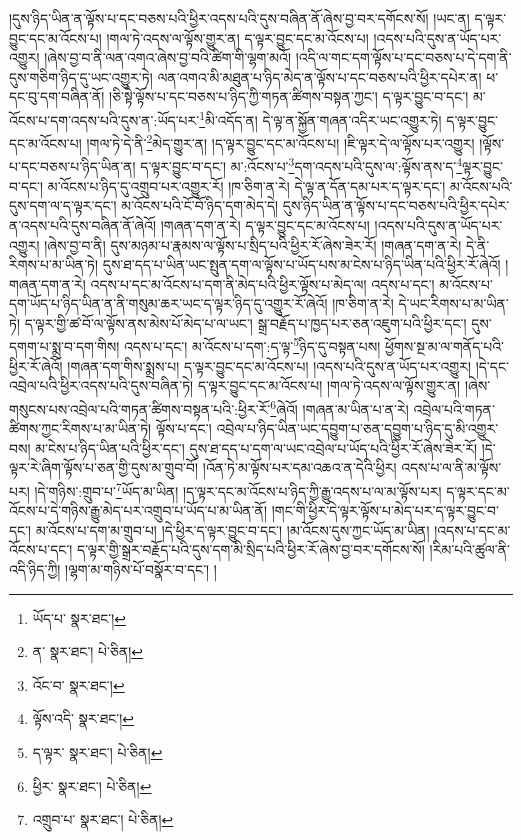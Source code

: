 །དུས་ཉིད་ཡིན་ན་ལྟོས་པ་དང་བཅས་པའི་ཕྱིར་འདས་པའི་དུས་བཞིན་ནོ་ཞེས་བྱ་བར་དགོངས་སོ། །ཡང་ན། ད་ལྟར་བྱུང་དང་མ་འོངས་པ། །གལ་ཏེ་འདས་ལ་ལྟོས་གྱུར་ན། ད་ལྟར་བྱུང་དང་མ་འོངས་པ། །འདས་པའི་དུས་ན་ཡོད་པར་འགྱུར། །ཞེས་བྱ་བ་ནི་ལན་འགའ་ཞེས་བྱ་བའི་ཚིག་གི་ལྷག་མའོ། །འདི་ལ་གང་དག་ལྟོས་པ་དང་བཅས་པ་དེ་དག་ནི་དུས་གཅིག་ཉིད་དུ་ཡང་འགྱུར་ཏེ། ལན་འགའ་མི་མཐུན་པ་ཉིད་མེད་ན་ལྟོས་པ་དང་བཅས་པའི་ཕྱིར་དཔེར་ན། ཕ་དང་བུ་དག་བཞིན་ནོ། །ཅི་སྟེ་ལྟོས་པ་དང་བཅས་པ་ཉིད་ཀྱི་གཏན་ཚིགས་བསྟན་ཀྱང་། ད་ལྟར་བྱུང་བ་དང་། མ་འོངས་པ་དག་འདས་པའི་དུས་ན་:ཡོད་པར་\footnote{ཡོད་པ་  སྣར་ཐང་། }མི་འདོད་ན། དེ་ལྟ་ན་སྐྱོན་གཞན་འདིར་ཡང་འགྱུར་ཏེ། ད་ལྟར་བྱུང་དང་མ་འོངས་པ། །གལ་ཏེ་དེ་ནི་\footnote{ན་  སྣར་ཐང་།  པེ་ཅིན། }མེད་གྱུར་ན། །ད་ལྟར་བྱུང་དང་མ་འོངས་པ། །ཇི་ལྟར་དེ་ལ་ལྟོས་པར་འགྱུར། །ལྟོས་པ་དང་བཅས་པ་ཉིད་ཡིན་ན། ད་ལྟར་བྱུང་བ་དང་། མ་:འོངས་པ་\footnote{འོང་བ་  སྣར་ཐང་། }དག་འདས་པའི་དུས་ལ་:ལྟོས་ནས་ད་\footnote{ལྟོས་འདི་  སྣར་ཐང་། }ལྟར་བྱུང་བ་དང་། མ་འོངས་པ་ཉིད་དུ་འགྲུབ་པར་འགྱུར་རོ། །ཁ་ཅིག་ན་རེ། དེ་ལྟ་ན་དོན་དམ་པར་ད་ལྟར་དང་། མ་འོངས་པའི་དུས་དག་ལ་ད་ལྟར་དང་། མ་འོངས་པའི་ངོ་བོ་ཉིད་དག་མེད་དེ། དུས་ཉིད་ཡིན་ན་ལྟོས་པ་དང་བཅས་པའི་ཕྱིར་དཔེར་ན་འདས་པའི་དུས་བཞིན་ནོ་ཞེའོ། །གཞན་དག་ན་རེ། ད་ལྟར་བྱུང་དང་མ་འོངས་པ། །འདས་པའི་དུས་ན་ཡོད་པར་འགྱུར། །ཞེས་བྱ་བ་ནི། དུས་མཉམ་པ་རྣམས་ལ་ལྟོས་པ་སྲིད་པའི་ཕྱིར་རོ་ཞེས་ཟེར་རོ། །གཞན་དག་ན་རེ། དེ་ནི་རིགས་པ་མ་ཡིན་ཏེ། དུས་ཐ་དད་པ་ཡིན་ཡང་སྤུན་དག་ལ་ལྟོས་པ་ཡོད་པས་མ་ངེས་པ་ཉིད་ཡིན་པའི་ཕྱིར་རོ་ཞེའོ། །གཞན་དག་ན་རེ། འདས་པ་དང་མ་འོངས་པ་དག་ནི་མེད་པའི་ཕྱིར་ལྟོས་པ་མེད་ལ། འདས་པ་དང་། མ་འོངས་པ་དག་ཡོད་པ་ཉིད་ཡིན་ན་ནི་གསུམ་ཆར་ཡང་ད་ལྟར་ཉིད་དུ་འགྱུར་རོ་ཞེའོ། །ཁ་ཅིག་ན་རེ། དེ་ཡང་རིགས་པ་མ་ཡིན་ཏེ། ད་ལྟར་གྱི་ཚ་བོ་ལ་ལྟོས་ནས་མེས་པོ་མེད་པ་ལ་ཡང་། སྒྲ་བརྗོད་པ་ཁྱད་པར་ཅན་འཇུག་པའི་ཕྱིར་དང་། དུས་དགག་པ་སྨྲ་བ་དག་གིས། འདས་པ་དང་། མ་འོངས་པ་དག་:ད་ལྟ་\footnote{ད་ལྟར་  སྣར་ཐང་།  པེ་ཅིན། }ཉིད་དུ་བསྟན་པས། ཕྱོགས་སྔ་མ་ལ་གནོད་པའི་ཕྱིར་རོ་ཞེའོ། །གཞན་དག་གིས་སྨྲས་པ། ད་ལྟར་བྱུང་དང་མ་འོངས་པ། །འདས་པའི་དུས་ན་ཡོད་པར་འགྱུར། །དེ་དང་འབྲེལ་པའི་ཕྱིར་འདས་པའི་དུས་བཞིན་ཏེ། ད་ལྟར་བྱུང་དང་མ་འོངས་པ། །གལ་ཏེ་འདས་ལ་ལྟོས་གྱུར་ན། །ཞེས་གསུངས་པས་འབྲེལ་པའི་གཏན་ཚིགས་བསྟན་པའི་:ཕྱིར་རོ་\footnote{ཕྱིར་  སྣར་ཐང་།  པེ་ཅིན། }ཞེའོ། །གཞན་མ་ཡིན་པ་ན་རེ། འབྲེལ་པའི་གཏན་ཚིགས་ཀྱང་རིགས་པ་མ་ཡིན་ཏེ། ལྟོས་པ་དང་། འབྲེལ་པ་ཉིད་ཡིན་ཡང་དབྱུག་པ་ཅན་དབྱུག་པ་ཉིད་དུ་མི་འགྱུར་བས། མ་ངེས་པ་ཉིད་ཡིན་པའི་ཕྱིར་དང་། དུས་ཐ་དད་པ་དག་ལ་ཡང་འབྲེལ་པ་ཡོད་པའི་ཕྱིར་རོ་ཞེས་ཟེར་རོ། །དེ་ལྟར་རེ་ཞིག་ལྟོས་པ་ཅན་གྱི་དུས་མ་གྲུབ་བོ། །འོན་ཏེ་མ་ལྟོས་པར་དམ་འཆའ་ན་དེའི་ཕྱིར། འདས་པ་ལ་ནི་མ་ལྟོས་པར། །དེ་གཉིས་:གྲུབ་པ་\footnote{འགྲུབ་པ་  སྣར་ཐང་།  པེ་ཅིན། }ཡོད་མ་ཡིན། །ད་ལྟར་དང་མ་འོངས་པ་ཉིད་ཀྱི་རྒྱུ་འདས་པ་ལ་མ་ལྟོས་པར། ད་ལྟར་དང་མ་འོངས་པ་དེ་གཉིས་རྒྱུ་མེད་པར་འགྲུབ་པ་ཡོད་པ་མ་ཡིན་ནོ། །གང་གི་ཕྱིར་དེ་ལྟར་ལྟོས་པ་མེད་པར་ད་ལྟར་བྱུང་བ་དང་། མ་འོངས་པ་དག་མ་གྲུབ་པ། །དེ་ཕྱིར་ད་ལྟར་བྱུང་བ་དང་། །མ་འོངས་དུས་ཀྱང་ཡོད་མ་ཡིན། །འདས་པ་དང་མ་འོངས་པ་དང་། ད་ལྟར་གྱི་སྒྲར་བརྗོད་པའི་དུས་དག་མི་སྲིད་པའི་ཕྱིར་རོ་ཞེས་བྱ་བར་དགོངས་སོ། །རིམ་པའི་ཚུལ་ནི་འདི་ཉིད་ཀྱི། །ལྷག་མ་གཉིས་པོ་བསྣོར་བ་དང་། །
